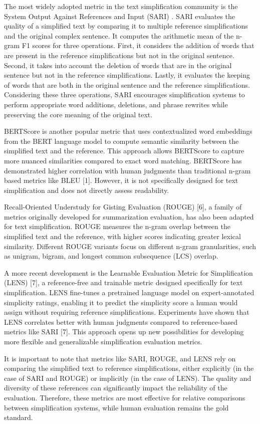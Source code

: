 The most widely adopted metric in the text simplification community is the System Output Against References and Input (SARI) \cite{xu-etal-2016-optimizing}. 
SARI evaluates the quality of a simplified text by comparing it to multiple reference simplifications and the original complex sentence. 
It computes the arithmetic mean of the n-gram F1 scores for three operations. First, it considers the addition of words that are present in the reference simplifications but not in the original sentence. Second, it takes into account the deletion of words that are in the original sentence but not in the reference simplifications. Lastly, it evaluates the keeping of words that are both in the original sentence and the reference simplifications. Considering these three operations, SARI encourages simplification systems to perform appropriate word additions, deletions, and phrase rewrites while preserving the core meaning of the original text.

BERTScore \cite{zhang2020bertscoreevaluatingtextgeneration} is another popular metric that uses contextualized word embeddings from the BERT language model to compute semantic similarity between the simplified text and the reference. This approach allows BERTScore to capture more nuanced similarities compared to exact word matching. BERTScore has demonstrated higher correlation with human judgments than traditional n-gram based metrics like BLEU [1]. However, it is not specifically designed for text simplification and does not directly assess readability.

Recall-Oriented Understudy for Gisting Evaluation (ROUGE) [6], a family of metrics originally developed for summarization evaluation, has also been adapted for text simplification. ROUGE measures the n-gram overlap between the simplified text and the reference, with higher scores indicating greater lexical similarity. Different ROUGE variants focus on different n-gram granularities, such as unigram, bigram, and longest common subsequence (LCS) overlap.

A more recent development is the Learnable Evaluation Metric for Simplification (LENS) [7], a reference-free and trainable metric designed specifically for text simplification. LENS fine-tunes a pretrained language model on expert-annotated simplicity ratings, enabling it to predict the simplicity score a human would assign without requiring reference simplifications. Experiments have shown that LENS correlates better with human judgments compared to reference-based metrics like SARI [7]. This approach opens up new possibilities for developing more flexible and generalizable simplification evaluation metrics.

It is important to note that metrics like SARI, ROUGE, and LENS rely on comparing the simplified text to reference simplifications, either explicitly (in the case of SARI and ROUGE) or implicitly (in the case of LENS). The quality and diversity of these references can significantly impact the reliability of the evaluation. Therefore, these metrics are most effective for relative comparisons between simplification systems, while human evaluation remains the gold standard.